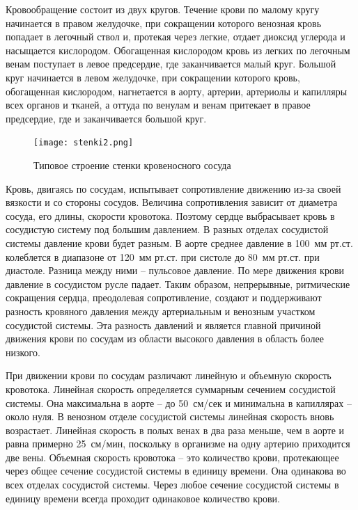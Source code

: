 Кровообращение состоит из двух кругов. Течение крови по малому кругу начинается в правом желудочке, при сокращении которого венозная кровь попадает в легочный ствол и, 
протекая через легкие, отдает диоксид углерода и насыщается кислородом. Обогащенная кислородом кровь из легких по легочным венам 
поступает в левое предсердие, где заканчивается малый круг. Большой круг начинается в левом желудочке, при сокращении которого кровь, 
обогащенная кислородом, нагнетается в аорту, артерии, артериолы и капилляры всех органов и тканей, а оттуда по венулам и венам 
притекает в правое предсердие, где и заканчивается большой круг.

\begin{figure}[h]
\centering
\texttt{[image: stenki2.png]}
\caption{Типовое строение стенки кровеносного сосуда ~\cite{blausen:2014}}
\label{tip}
\end{figure}

Кровь, двигаясь по сосудам, испытывает сопротивление движению из-за своей вязкости и со стороны сосудов. 
Величина сопротивления зависит от диаметра сосуда, его длины, скорости кровотока. Поэтому сердце выбрасывает кровь 
в сосудистую систему под большим давлением. В разных отделах сосудистой системы давление крови будет разным. 
В аорте среднее давление в 100~мм рт.ст. колеблется в диапазоне от 120~мм рт.ст. при систоле до 80~мм рт.ст. при диастоле. 
Разница между ними -- пульсовое давление. По мере движения крови давление в сосудистом русле падает. Таким образом, непрерывные, 
ритмические сокращения сердца, преодолевая сопротивление, создают и поддерживают разность кровяного давления между артериальным и 
венозным участком сосудистой системы. Эта разность давлений и является главной причиной движения крови по сосудам из области высокого 
давления в область более низкого.

При движении крови по сосудам различают линейную и объемную скорость кровотока. Линейная скорость определяется суммарным 
сечением сосудистой системы. Она максимальна в аорте -- до 50~см/сек и минимальна в капиллярах -- около нуля. 
В венозном отделе сосудистой системы линейная скорость вновь возрастает. Линейная скорость в полых венах в два раза меньше, 
чем в аорте и равна примерно 25~см/мин, поскольку в организме на одну артерию приходится две вены. 
Объемная скорость кровотока -- это количество крови, протекающее через общее сечение сосудистой системы в единицу времени. 
Она одинакова во всех отделах сосудистой системы. Через любое сечение сосудистой системы в единицу времени всегда проходит 
одинаковое количество крови.

